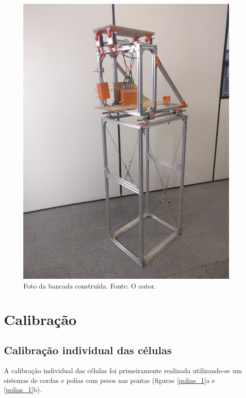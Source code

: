 \begin{figure}[!ht]
    \centering
    \includegraphics[width=.8\linewidth]{figuras/calibracao/bancada_completa.jpg}
    \caption{Foto da bancada construída. Fonte: O autor.}
    \label{fig:bancada_construida}
\end{figure}

\section{Calibração}

\subsection{Calibração individual das células}
A calibração individual das células foi primeiramente realizada utilizando-se um sistemas de cordas e polias com pesos nas pontas (figuras \ref{polias_1}a e \ref{polias_1}b).

